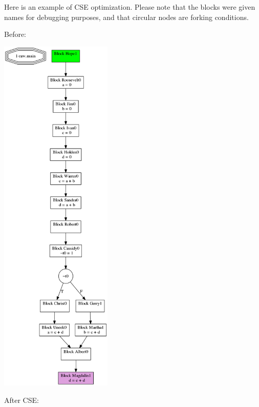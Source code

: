 \documentclass[11pt]{article}
\begin{document}
  Here is an example of CSE optimization. Please note that the blocks were given names for debugging 
  purposes, and that circular nodes are forking conditions.

  Before: 

  \includegraphics[width=0.4\textwidth]{./before_cse.png}
  
  After CSE:
\end{document}
